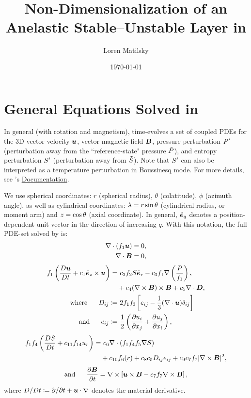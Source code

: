\documentclass[12pt]{article}
\date{\today}
\author{Loren Matilsky}
\title{Non-Dimensionalization of an Anelastic Stable--Unstable Layer in {\rayleigh}}
\numberwithin{equation}{section}
\begin{document}
	\maketitle
	\section{General Equations Solved in {\rayleigh}}
	In general (with rotation and magnetism), {\rayleigh} time-evolves a set of coupled PDEs for the 3D vector velocity $\bm{u}$, vector magnetic field $\bm{B}$, pressure perturbation ${P^\prime}$ (perturbation away from the ``reference-state" pressure $\tilde{P}$), and entropy perturbation ${S^\prime}$ (perturbation away from $\tilde{S}$). Note that ${S^\prime}$ can also be interpreted as a temperature perturbation in Boussinesq mode. For more details, see {\rayleigh}'s \href{https://rayleigh-documentation.readthedocs.io/en/latest/doc/source/User_Guide/physics_math_overview.html#the-system-of-equations-solved-in-rayleigh}{Documentation}. 
	
	We use spherical coordinates: $r$ (spherical radius), $\theta$ (colatitude), $\phi$ (azimuth angle), as well as cylindrical coordinates: $\lambda=r\sin\theta$ (cylindrical radius, or moment arm) and $z=\cos\theta$ (axial coordinate). In general, $\hat{\bm{e}}_q$ denotes a position-dependent unit vector in the direction of increasing $q$. With this notation, the full PDE-set solved by {\rayleigh} is:
	\begin{align}
	\nabla\cdot(f_1\bm{u}) &= 0\label{eq:contgen},\\
	\nabla\cdot \bm{B} &= 0,
\end{align}
\begin{subequations}\label{eq:momgen}
	\begin{align}
		f_1\left(\matderiv{\vecu}+c_1\ez\times\vecu\right) =&\ c_2f_2 S\er - c_3 f_1\nabla\left(\frac{P}{f_1} \right), \nonumber\\
		& +c_4(\curl\vecb)\times\vecb+c_5\Div\bm{D},\\
		\where D_{ij} \define&\ 2f_1 f_3 \left[e_{ij} - \frac{1}{3}(\Div\vecu) \delta_{ij} \right]\label{eq:dstressgen}\\
		\andd e_{ij} \define&\ \frac{1}{2}\left(\pderiv{u_i}{x_j} + \pderiv{u_j}{x_i} \right),\label{eq:estressgen}
	\end{align}
\end{subequations}
\begin{align}\label{eq:engen}
	f_1 f_4 \left(\matderiv{S} + c_{11}f_{14} u_r\right) =&\ c_6\Div(f_1 f_4 f_5 \nabla S) \nonumber \\
	&+ c_{10}f_6(r) + c_8 c_5 D_{ij}e_{ij} +c_9c_7f_7|\curl\vecb|^2,
\end{align}
\begin{align}\label{eq:indgen}
	\text{and}\ \ \ \ \  \frac{\partial\bm{B}}{\partial t} = \nabla\times\left[\bm{u}\times\bm{B} - c_7 f_7\nabla\times\bm{B}\right],
\end{align}
where $D/Dt\coloneqq \partial/\partial t+\bm{u}\cdot\nabla$ denotes the material derivative. 
\end{document}
